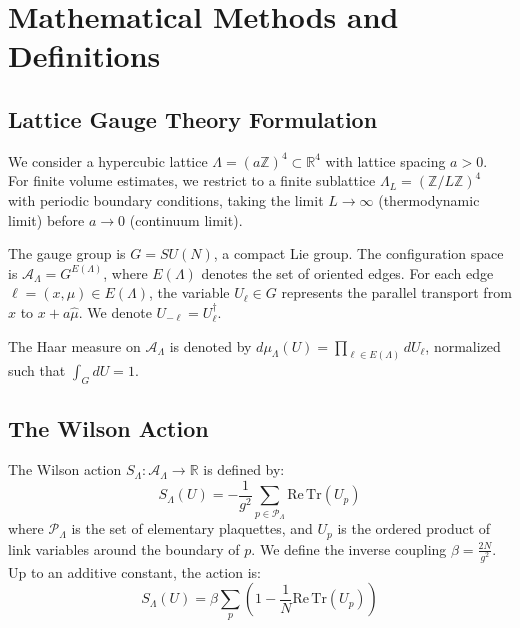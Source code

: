 
\section{Mathematical Methods and Definitions}
\label{sec:framework_app145}
\label{app:definitive_proof}

\subsection{Lattice Gauge Theory Formulation}
We consider a hypercubic lattice $\Lambda = (a\mathbb{Z})^4 \subset \mathbb{R}^4$ with lattice spacing $a > 0$. For finite volume estimates, we restrict to a finite sublattice $\Lambda_L = (\mathbb{Z}/L\mathbb{Z})^4$ with periodic boundary conditions, taking the limit $L \to \infty$ (thermodynamic limit) before $a \to 0$ (continuum limit).

The gauge group is $G = SU(N)$, a compact Lie group. The configuration space is $\mathcal{A}_\Lambda = G^{E(\Lambda)}$, where $E(\Lambda)$ denotes the set of oriented edges. For each edge $\ell = (x, \mu) \in E(\Lambda)$, the variable $U_\ell \in G$ represents the parallel transport from $x$ to $x + a\hat{\mu}$. We denote $U_{-\ell} = U_\ell^\dagger$.

The Haar measure on $\mathcal{A}_\Lambda$ is denoted by $d\mu_\Lambda(U) = \prod_{\ell \in E(\Lambda)} dU_\ell$, normalized such that $\int_G dU = 1$.

\subsection{The Wilson Action}
The Wilson action $S_\Lambda: \mathcal{A}_\Lambda \to \mathbb{R}$ is defined by:
\begin{equation}
S_\Lambda(U) = -\frac{1}{g^2} \sum_{p \in \mathcal{P}_\Lambda} \mathrm{Re}\,\mathrm{Tr}(U_p)
\end{equation}
where $\mathcal{P}_\Lambda$ is the set of elementary plaquettes, and $U_p$ is the ordered product of link variables around the boundary of $p$. We define the inverse coupling $\beta = \frac{2N}{g^2}$. Up to an additive constant, the action is:
\begin{equation}
S_\Lambda(U) = \beta \sum_{p} \left( 1 - \frac{1}{N} \mathrm{Re}\,\mathrm{Tr}(U_p) \right)
\end{equation}

